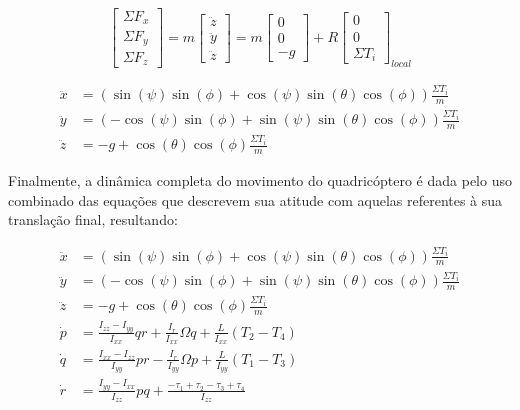 \documentclass[main.tex]{subfiles}
\begin{document}
{\begin{equation}\label{eq:translacao_vetor}
    \begin{bmatrix}
        \Sigma F_x\\
        \Sigma F_y\\
        \Sigma F_z
    \end{bmatrix} 
    = m
    \begin{bmatrix}
        \ddot{z}\\
        \ddot{y}\\
        \ddot{z}
    \end{bmatrix} 
    = m
    \begin{bmatrix}
        0\\
        0\\
        -g
    \end{bmatrix}
    +
    R
    \begin{bmatrix}
        0\\
        0\\
        \Sigma T_i
    \end{bmatrix}_{local}
\end{equation}

\begin{equation}\label{eq:translacao}
    \begin{split}
        \ddot{x} &= (\sin{(\psi)}\sin{(\phi)} + \cos{(\psi)}\sin{(\theta)}\cos{(\phi)})\frac{\Sigma T_i}{m}\\
        \ddot{y} &= (-\cos{(\psi)}\sin{(\phi)} + \sin{(\psi)}\sin{(\theta)}\cos{(\phi)})\frac{\Sigma T_i}{m}\\
        \ddot{z} &= -g + \cos{(\theta)}\cos{(\phi)}\frac{\Sigma T_i}{m}
    \end{split}
\end{equation}

Finalmente, a dinâmica completa do movimento do quadricóptero é dada pelo uso combinado das equações que descrevem sua atitude com aquelas referentes à sua translação final, resultando:

\begin{equation}\label{eq:dinamica_raw}
    \begin{split}
        \ddot{x} &= (\sin{(\psi)}\sin{(\phi)} + \cos{(\psi)}\sin{(\theta)}\cos{(\phi)})\frac{\Sigma T_i}{m}\\
        \ddot{y} &= (-\cos{(\psi)}\sin{(\phi)} + \sin{(\psi)}\sin{(\theta)}\cos{(\phi)})\frac{\Sigma T_i}{m}\\
        \ddot{z} &= -g + \cos{(\theta)}\cos{(\phi)}\frac{\Sigma T_i}{m}\\
        \dot{p} &= \frac{I_{zz} - I_{yy}}{I_{xx}}qr + \frac{I_r}{I_{xx}}\Omega q + \frac{L}{I_{xx}}(T_2 - T_4)\\
        \dot{q} &= \frac{I_{xx} - I_{zz}}{I_{yy}}pr - \frac{I_r}{I_{yy}}\Omega p + \frac{L}{I_{yy}}(T_1 - T_3)\\
        \dot{r} &= \frac{I_{yy} - I_{xx}}{I_{zz}}pq + \frac{- \tau_1 + \tau_2 - \tau_3 + \tau_4}{I_{zz}}
    \end{split}
\end{equation}

}
\end{document}
